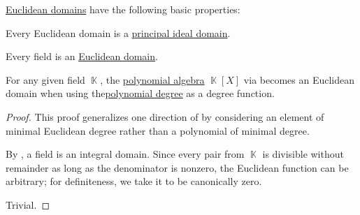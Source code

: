 \begin{proposition}\label{thm:def:euclidean_domain}
  \hyperref[def:euclidean_domain]{Euclidean domains} have the following basic properties:
  \begin{thmenum}
     Every Euclidean domain is a \hyperref[def:principal_ideal_domain]{principal ideal domain}.

     Every field is an \hyperref[def:euclidean_domain]{Euclidean domain}.

     For any given field \( \BbbK \), the \hyperref[def:polynomial_algebra]{polynomial algebra} \( \BbbK[X] \) via  becomes an Euclidean domain when using the\hyperref[def:polynomial_degree]{polynomial degree} as a degree function.
  \end{thmenum}
\end{proposition}
\begin{proof}
   This proof generalizes one direction of  by considering an element of minimal Euclidean degree rather than a polynomial of minimal degree.

   By , a field is an integral domain. Since every pair from \( \BbbK \) is divisible without remainder as long as the denominator is nonzero, the Euclidean function can be arbitrary; for definiteness, we take it to be canonically zero.

   Trivial.
\end{proof}

